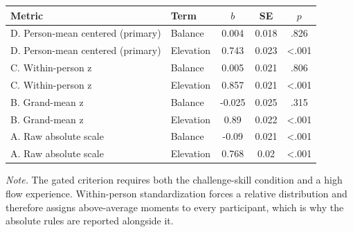 \begin{table}[!htbp]
\begin{tabular*}{\textwidth}{@{\extracolsep{\fill}}llccc@{}}
\toprule
Metric & Term & $b$ & SE & $p$ \\
\midrule
D. Person-mean centered (primary) & Balance & 0.004 & 0.018 & .826 \\
D. Person-mean centered (primary) & Elevation & 0.743 & 0.023 & <.001 \\
C. Within-person z & Balance & 0.005 & 0.021 & .806 \\
C. Within-person z & Elevation & 0.857 & 0.021 & <.001 \\
B. Grand-mean z & Balance & -0.025 & 0.025 & .315 \\
B. Grand-mean z & Elevation & 0.89 & 0.022 & <.001 \\
A. Raw absolute scale & Balance & -0.09 & 0.021 & <.001 \\
A. Raw absolute scale & Elevation & 0.768 & 0.02 & <.001 \\
\bottomrule
\end{tabular*}
\par\vspace{3pt}\noindent\parbox{\textwidth}{\footnotesize\textit{Note.} The gated criterion requires both the challenge-skill condition and a high flow experience. Within-person standardization forces a relative distribution and therefore assigns above-average moments to every participant, which is why the absolute rules are reported alongside it.}
\endgroup
\end{table}
